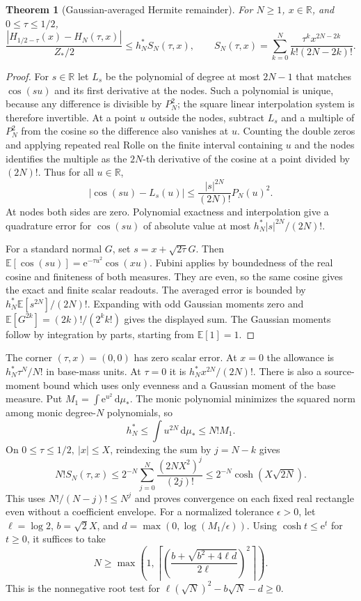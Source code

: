 \documentclass[11pt]{article}
\numberwithin{equation}{section}
\newtheorem{theorem}{Theorem}[section]
\newcommand{\R}{\mathbb R}
\newcommand{\ee}{\mathrm e}
\newcommand{\dd}{\,\mathrm d}
\begin{document}
\begin{theorem}[Gaussian-averaged Hermite remainder]\label{thm:hermite}
For \(N\ge1\), \(x\in\R\), and \(0\le\tau\le1/2\),
\begin{equation}\label{eq:hermite}
 \frac{|H_{1/2-\tau}(x)-H_N(\tau,x)|}{Z_*/2}
   \le h_N^* S_N(\tau,x),\qquad
 S_N(\tau,x)=\sum_{k=0}^N\frac{\tau^k x^{2N-2k}}{k!(2N-2k)!}.
\end{equation}
\end{theorem}
\begin{proof}
For \(s\in\R\) let \(L_s\) be the polynomial of degree at most
\(2N-1\) that matches \(\cos(su)\) and its first derivative at
the nodes. Such a polynomial is unique, because any difference
is divisible by \(P_N^2\); the square linear interpolation
system is therefore invertible. At a point \(u\) outside the
nodes, subtract \(L_s\) and a multiple of \(P_N^2\) from the
cosine so the difference also vanishes at \(u\). Counting the
double zeros and applying repeated real Rolle on the finite
interval containing \(u\) and the nodes identifies the multiple
as the \(2N\)-th derivative of the cosine at a point divided by
\((2N)!\). Thus for all \(u\in\R\),
\[
 |\cos(su)-L_s(u)|
     \le \frac{|s|^{2N}}{(2N)!}P_N(u)^2.
\]
At nodes both sides are zero. Polynomial exactness and
interpolation give a quadrature error for \(\cos(su)\) of
absolute value at most \(h_N^*|s|^{2N}/(2N)!\).

For a standard normal \(G\), set \(s=x+\sqrt{2\tau}G\).
Then \(\mathbb E[\cos(su)]=\ee^{-\tau u^2}\cos(xu)\).
Fubini applies by boundedness of the real cosine and finiteness
of both measures. They are even, so the same cosine gives the
exact and finite scalar readouts. The averaged error is bounded
by \(h_N^*\mathbb E[s^{2N}]/(2N)!\). Expanding with odd
Gaussian moments zero and
\(\mathbb E[G^{2k}]=(2k)!/(2^kk!)\) gives the displayed
sum. The Gaussian moments follow by integration by parts,
starting from \(\mathbb E[1]=1\).
\end{proof}

The corner \((\tau,x)=(0,0)\) has zero scalar error. At \(x=0\)
the allowance is \(h_N^*\tau^N/N!\) in base-mass units. At
\(\tau=0\) it is \(h_N^*x^{2N}/(2N)!\). There is also a
source-moment bound which uses only evenness and a Gaussian
moment of the base measure. Put \(M_1=\int\ee^{u^2}\dd\mu_*\).
The monic polynomial minimizes the squared norm among monic
degree-\(N\) polynomials, so
\[
 h_N^*\le\int u^{2N}\dd\mu_*\le N!M_1 .
\]
On \(0\le\tau\le1/2,\ |x|\le X\), reindexing the sum by
\(j=N-k\) gives
\[
 N!S_N(\tau,x)\le 2^{-N}\sum_{j=0}^N
   \frac{(2NX^2)^j}{(2j)!}\le 2^{-N}\cosh(X\sqrt{2N}).
\]
This uses \(N!/(N-j)!\le N^j\) and proves convergence on each
fixed real rectangle even without a coefficient envelope.
For a normalized tolerance \(\epsilon>0\), let
\(\ell=\log2\), \(b=\sqrt2 X\), and
\(d=\max(0,\log(M_1/\epsilon))\). Using \(\cosh t\le\ee^t\)
for \(t\ge0\), it suffices to take
\[
 N\ge\max\left(1,\left\lceil
     \left(\frac{b+\sqrt{b^2+4\ell d}}{2\ell}\right)^2
   \right\rceil\right).
\]
This is the nonnegative root test for
\(\ell(\sqrt N)^2-b\sqrt N-d\ge0\).
\end{document}
